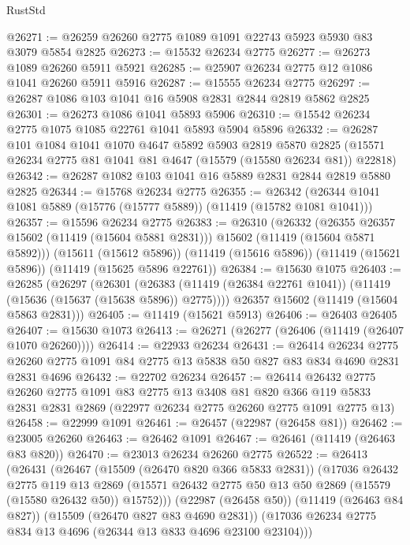 \begin{lexlean}{RustStd}
\begin{coremodule}
@26271 := @26259 @26260 @2775 @1089 @1091 @22743 @5923 @5930 @83 @3079 @5854 @2825
@26273 := @15532 @26234 @2775
@26277 := @26273 @1089 @26260 @5911 @5921
@26285 := @25907 @26234 @2775 @12 @1086 @1041 @26260 @5911 @5916
@26287 := @15555 @26234 @2775
@26297 := @26287 @1086 @103 @1041 @16 @5908 @2831 @2844 @2819 @5862 @2825
@26301 := @26273 @1086 @1041 @5893 @5906
@26310 := @15542 @26234 @2775 @1075 @1085 @22761 @1041 @5893 @5904 @5896
@26332 := @26287
    @101
    @1084
    @1041
    @1070
    @4647
    @5892
    @5903
    @2819
    @5870
    @2825
    (@15571 @26234 @2775 @81 @1041 @81 @4647 (@15579 (@15580 @26234 @81)) @22818)
@26342 := @26287 @1082 @103 @1041 @16 @5889 @2831 @2844 @2819 @5880 @2825
@26344 := @15768 @26234 @2775
@26355 := @26342 (@26344 @1041 @1081 @5889 (@15776 (@15777 @5889)) (@11419 (@15782 @1081 @1041)))
@26357 := @15596 @26234 @2775
@26383 := @26310
    (@26332
      (@26355 @26357 @15602 (@11419 (@15604 @5881 @2831)))
      @15602
      (@11419 (@15604 @5871 @5892)))
    (@15611 (@15612 @5896))
    (@11419 (@15616 @5896))
    (@11419 (@15621 @5896))
    (@11419 (@15625 @5896 @22761))
@26384 := @15630 @1075
@26403 := @26285
    (@26297
      (@26301
        (@26383 (@11419 (@26384 @22761 @1041)) (@11419 (@15636 (@15637 (@15638 @5896)) @2775))))
      @26357
      @15602
      (@11419 (@15604 @5863 @2831)))
@26405 := @11419 (@15621 @5913)
@26406 := @26403 @26405
@26407 := @15630 @1073
@26413 := @26271 (@26277 (@26406 (@11419 (@26407 @1070 @26260))))
@26414 := @22933 @26234
@26431 := @26414
    @26234
    @2775
    @26260
    @2775
    @1091
    @84
    @2775
    @13
    @5838
    @50
    @827
    @83
    @834
    @4690
    @2831
    @2831
    @4696
@26432 := @22702 @26234
@26457 := @26414
    @26432
    @2775
    @26260
    @2775
    @1091
    @83
    @2775
    @13
    @3408
    @81
    @820
    @366
    @119
    @5833
    @2831
    @2831
    @2869
    (@22977 @26234 @2775 @26260 @2775 @1091 @2775 @13)
@26458 := @22999 @1091
@26461 := @26457 (@22987 (@26458 @81))
@26462 := @23005 @26260
@26463 := @26462 @1091
@26467 := @26461 (@11419 (@26463 @83 @820))
@26470 := @23013 @26234 @26260 @2775
@26522 := @26413
    (@26431
      (@26467
        (@15509 (@26470 @820 @366 @5833 @2831))
        (@17036
          @26432
          @2775
          @119
          @13
          @2869
          (@15571 @26432 @2775 @50 @13 @50 @2869 (@15579 (@15580 @26432 @50)) @15752)))
      (@22987 (@26458 @50))
      (@11419 (@26463 @84 @827))
      (@15509 (@26470 @827 @83 @4690 @2831))
      (@17036 @26234 @2775 @834 @13 @4696 (@26344 @13 @833 @4696 @23100 @23104)))

\end{coremodule}
\end{lexlean}
